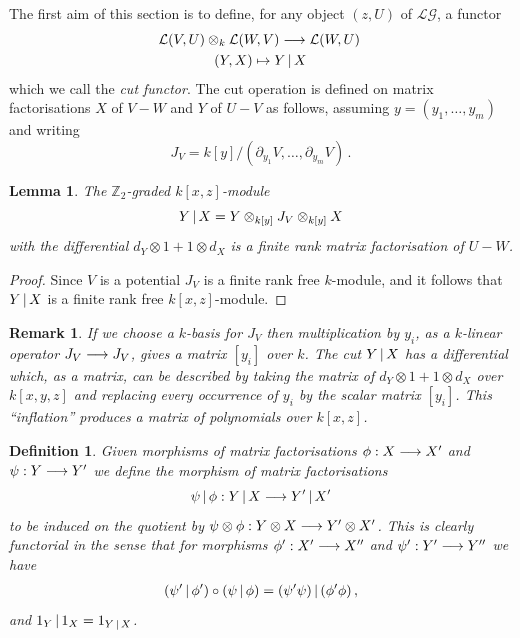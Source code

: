 \documentclass[english,letter paper,12pt,leqno]{article}
\newtheorem{lemma}[theorem]{Lemma}
\theoremstyle{example}
\newtheorem{definition}[theorem]{Definition}
\newtheorem{remark}[theorem]{Remark}
\numberwithin{equation}{section}
\def\LG{\mathcal{LG}}
\def\be{\begin{equation}}
\def\ee{\end{equation}}
\def\nZ{\mathds{Z}}
\begin{document}
 The first aim of this section is to define, for any object $(z,U)$ of $\LG$, a functor
\begin{gather*}
\mathcal{L}(V,U) \otimes_k \mathcal{L}(W,V) \longrightarrow \mathcal{L}(W, U)\,\\
(Y,X) \mapsto Y \,|\, X
\end{gather*}
which we call the \textsl{cut functor}. The cut operation is defined on matrix factorisations $X$ of $V - W$ and $Y$ of $U - V$ as follows, assuming $y = (y_1,\ldots,y_m)$ and writing
\be\label{eq:defnjacobian}
J_V = k[y] / ( \partial_{y_1} V, \ldots, \partial_{y_m} V )\,.
\ee

\begin{lemma} The $\nZ_2$-graded $k[x,z]$-module
\[
Y \,|\, X = Y \otimes_{k[y]} J_V \otimes_{k[y]} X
\]
with the differential $d_Y \otimes 1 + 1 \otimes d_X$ is a finite rank matrix factorisation of $U - W$.
\end{lemma}
\begin{proof}
Since $V$ is a potential $J_V$ is a finite rank free $k$-module, and it follows that $Y \,|\, X$ is a finite rank free $k[x,z]$-module. 


\end{proof}

\begin{remark}\label{remark:inflation} If we choose a $k$-basis for $J_V$ then multiplication by $y_i$, as a $k$-linear operator $J_V \longrightarrow J_V$, gives a matrix $[y_i]$ over $k$. The cut $Y \,|\, X$ has a differential which, as a matrix, can be described by taking the matrix of $d_Y \otimes 1 + 1 \otimes d_X$ over $k[x,y,z]$ and replacing every occurrence of $y_i$ by the scalar matrix $[y_i]$. This ``inflation'' produces a matrix of polynomials over $k[x,z]$. 
\end{remark}

\begin{definition} Given morphisms of matrix factorisations $\phi: X \longrightarrow X'$ and $\psi: Y \longrightarrow Y'$ we define the morphism of matrix factorisations
\[
\psi \,|\, \phi: Y \,|\, X \longrightarrow Y' \,|\, X'
\]
to be induced on the quotient by $\psi \otimes \phi: Y \otimes X \longrightarrow Y' \otimes X'$. This is clearly functorial in the sense that for morphisms $\phi': X' \longrightarrow X''$ and $\psi': Y' \longrightarrow Y''$ we have
\begin{align}
( \psi' \,|\, \phi' ) \circ ( \psi \,|\, \phi ) = ( \psi' \psi ) \,|\, ( \phi' \phi )\,,
\end{align}
and $1_Y \,|\, 1_X = 1_{Y \,|\, X}$.
\end{definition}
\end{document}
